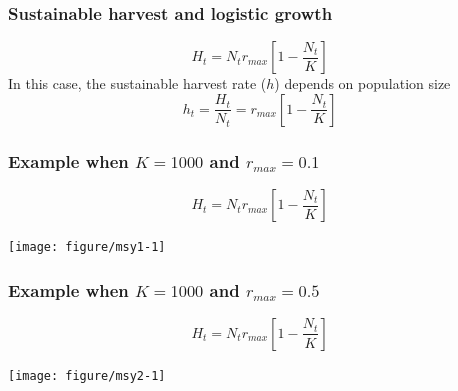 \documentclass[color=usenames,dvipsnames]{beamer}\usepackage[]{graphicx}\usepackage[]{color}
\begin{document}
\begin{frame}
  \frametitle{Sustainable harvest and logistic growth}
  \LARGE
  \[
    H_t = N_t r_{max}\left[1 - \frac{N_t}{K} \right]
  \]
  \pause
  \vfill
  \Large
  In this case, the sustainable harvest rate ($h$) depends on population size
  \vfill
  \pause
  \[
    h_t = \frac{H_t}{N_t} = r_{max}\left[1 - \frac{N_t}{K} \right]
  \]
\end{frame}



\begin{frame}[fragile]
  \frametitle{Example when $K=1000$ and $r_{max}=0.1$}
  \scriptsize
  \[
    H_t = N_t r_{max}\left[1 - \frac{N_t}{K} \right]
  \]
  \vspace{-1cm}

  \begin{center}
  \texttt{[image: figure/msy1-1]}
  \end{center}
\end{frame}




\begin{frame}[fragile]
  \frametitle{Example when $K=1000$ and $r_{max}=0.5$}
  \scriptsize
  \[
    H_t = N_t r_{max}\left[1 - \frac{N_t}{K} \right]
  \]
  \vspace{-1cm}

\begin{center}
  \texttt{[image: figure/msy2-1]}
\end{center}
\end{frame}
\end{document}
